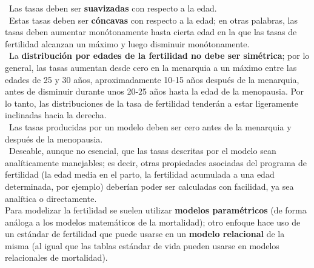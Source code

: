 \vspace{-0.3cm}
\textbullet\ Las tasas deben ser \textbf{suavizadas} con respecto a la edad.\\

\vspace{-0.3cm}
\textbullet\ Estas tasas deben ser \textbf{cóncavas} con respecto a la edad; en otras palabras, las tasas deben aumentar monótonamente hasta cierta edad en la que las tasas de fertilidad alcanzan un máximo y luego disminuir monótonamente.\\

\vspace{-0.3cm}
\textbullet\ La \textbf{distribución por edades de la fertilidad no debe ser simétrica}; por lo general, las tasas aumentan desde cero en la menarquia a un máximo entre las edades de 25 y 30 años, aproximadamente 10-15 años después de la menarquia, antes de disminuir durante unos 20-25 años hasta la edad de la menopausia. Por lo tanto, las distribuciones de la tasa de fertilidad tenderán a estar ligeramente inclinadas hacia la derecha.\\

\vspace{-0.3cm}
\textbullet\ Las tasas producidas por un modelo deben ser cero antes de la menarquia y después de la menopausia.\\

\vspace{-0.3cm}
\textbullet\ Deseable, aunque no esencial, que las tasas descritas por el modelo sean analíticamente manejables; es decir, otras propiedades asociadas del programa de fertilidad (la edad media en el parto, la fertilidad acumulada a una edad determinada, por ejemplo) deberían poder ser calculadas con facilidad, ya sea analítica o directamente.\\

Para modelizar la fertilidad se suelen utilizar \textbf{modelos paramétricos} (de forma análoga a los modelos matemáticos de la mortalidad); otro enfoque hace uso de un estándar de fertilidad que puede usarse en un \textbf{modelo relacional} de la misma (al igual que las tablas estándar de vida pueden usarse en modelos relacionales de mortalidad).\\ 

